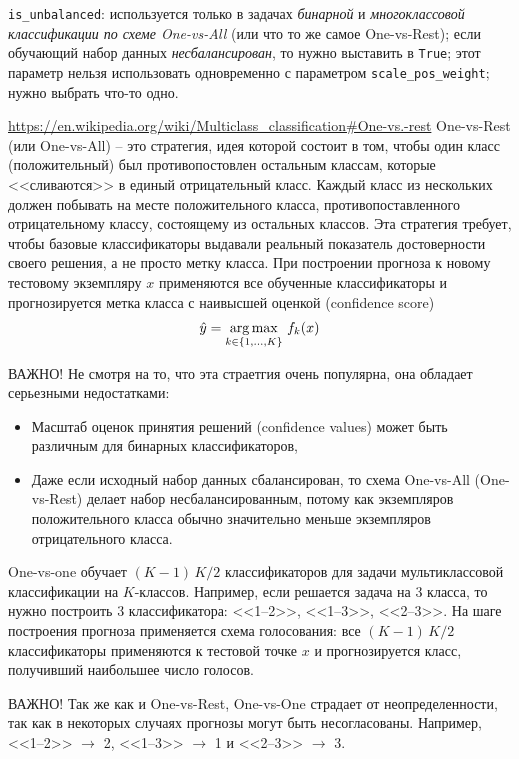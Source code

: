 \documentclass[%
	11pt,
	a4paper,
	utf8,
		]{article}
\begin{document}
\verb|is_unbalanced|: используется только в задачах \emph{бинарной} и \emph{многоклассовой классификации по схеме One-vs-All} (или что то же самое One-vs-Rest); если обучающий набор данных \emph{несбалансирован}, то нужно выставить в \verb|True|; этот параметр нельзя использовать одновременно с параметром \verb|scale_pos_weight|; нужно выбрать что-то одно.

\url{https://en.wikipedia.org/wiki/Multiclass_classification#One-vs.-rest} One-vs-Rest (или One-vs-All) -- это стратегия, идея которой состоит в том, чтобы один класс (положительный) был противопостовлен остальным классам, которые <<сливаются>> в единый отрицательный класс. Каждый класс из нескольких должен побывать на месте положительного класса, противопоставленного отрицательному классу, состоящему из остальных классов. Эта стратегия требует, чтобы базовые классификаторы выдавали реальный показатель достоверности своего решения, а не просто метку класса. При построении прогноза к новому тестовому экземпляру $ x $ применяются все обученные классификаторы и прогнозируется метка класса с наивысшей оценкой (confidence score)
\begin{align*}
	\hat{y} = \operatorname*{arg\,max}_{k \in \{1, \ldots, K\}} \, f_k(x)
\end{align*}

ВАЖНО! Не смотря на то, что эта страетгия очень популярна, она обладает серьезными недостатками:
\begin{itemize}
	\item Масштаб оценок принятия решений (confidence values) может быть различным для бинарных классификаторов,
	
	\item Даже если исходный набор данных сбалансирован, то схема One-vs-All (One-vs-Rest) делает набор несбалансированным, потому как экземпляров положительного класса обычно значительно меньше экземпляров отрицательного класса.
\end{itemize}

One-vs-one обучает $ (K - 1) \, K / 2 $ классификаторов для задачи мультиклассовой классификации на $ K $-классов. Например, если решается задача на 3 класса, то нужно построить 3 классификатора: <<1--2>>, <<1--3>>, <<2--3>>. На шаге построения прогноза применяется схема голосования: все $ (K - 1) \, K / 2 $ классификаторы применяются к тестовой точке $ x $ и прогнозируется класс, получивший наибольшее число голосов.

ВАЖНО! Так же как и One-vs-Rest, One-vs-One страдает от неопределенности, так как в некоторых случаях прогнозы могут быть несогласованы. Например, <<1--2>> $ \rightarrow $ 2, <<1--3>> $ \rightarrow $ 1 и <<2--3>> $ \rightarrow $ 3.
\end{document}
